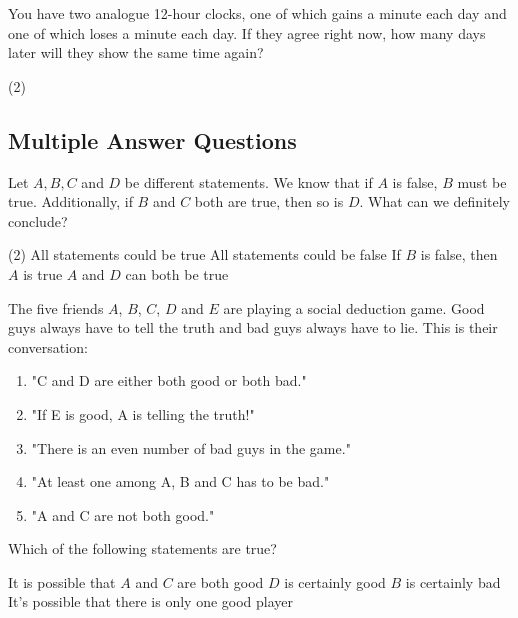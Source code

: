 \documentclass{article}
\begin{document}
\begin{problem}
You have two analogue 12-hour clocks, one of which gains a minute each day and one of which loses a minute each day. If they agree right now, how many days later will they show the same time again?
\end{problem}
\begin{tasks}(2)

\end{tasks}


\subsection{Multiple Answer Questions}

\begin{problem}
Let $A,B,C$ and $D$ be different statements. We know that if $A$ is false, $B$ must be true. Additionally, if $B$ and $C$ both are true, then so is $D$. What can we definitely conclude?
\begin{tasks2}(2)
\task All statements could be true
\task All statements could be false
\task If $B$ is false, then $A$ is true
\task $A$ and $D$ can both be true
\end{tasks2}
\end{problem}

\begin{problem}
The five friends $A$, $B$, $C$, $D$ and $E$ are playing a social deduction game. Good guys always have to tell the truth and bad guys always have to lie. This is their conversation:
\begin{enumerate}[label=\Alph*:]
    \item "C and D are either both good or both bad." 
    \item "If E is good, A is telling the truth!"
    \item "There is an even number of bad guys in the game."
    \item "At least one among A, B and C has to be bad."
    \item "A and C are not both good."
\end{enumerate}
Which of the following statements are true?
\end{problem}
\begin{tasks2}
\task It is possible that $A$ and $C$ are both good
\task $D$ is certainly good
\task $B$ is certainly bad
\task It's possible that there is only one good player
\end{tasks2}
\end{document}
